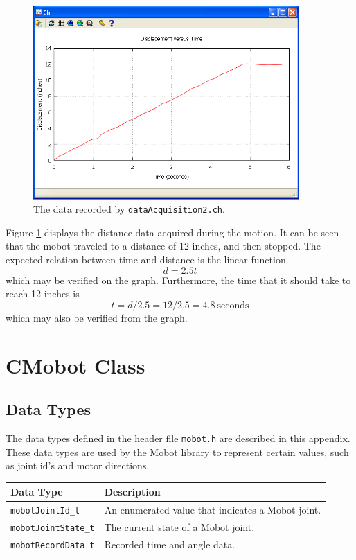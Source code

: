 \documentclass{article}
\begin{document}
\begin{figure}[H]
\centering
\includegraphics[width=4in]{images/dataacq3_plot1.png}
\caption{\label{fig:dataacq3_fig1} The data recorded by \texttt{dataAcquisition2.ch}.}
\end{figure}

Figure \ref{fig:dataacq3_fig1} displays the distance data acquired during the motion. It can
be seen that the mobot traveled to a distance of 12 inches, and then stopped. The
expected relation between time and distance is the linear function 
\begin{equation*}
d = 2.5t
\end{equation*}
which may be verified on the graph. Furthermore, the time that it should take to reach 
12 inches is 
\begin{equation}
t = d / 2.5 = 12 / 2.5 = 4.8 ~\text{seconds}
\end{equation}
which may also be verified from the graph.

\newpage
\appendix
\section{CMobot Class}
\subsection{\label{sec:datatypes}Data Types}
The data types defined in the header file \texttt{mobot.h} are described in
this appendix.
These data types are used by the Mobot library to represent 
certain values, such as joint id's and motor directions.

\begin{tabular}{p{3.5cm}p{10cm}} \hline 
Data Type& Description \\
\hline 
\texttt{mobotJointId\_t} & An enumerated value that indicates a Mobot joint. \\
\texttt{mobotJointState\_t} & The current state of a Mobot joint. \\
\texttt{mobotRecordData\_t} & Recorded time and angle data. \\
\hline
\end{tabular}
\end{document}
